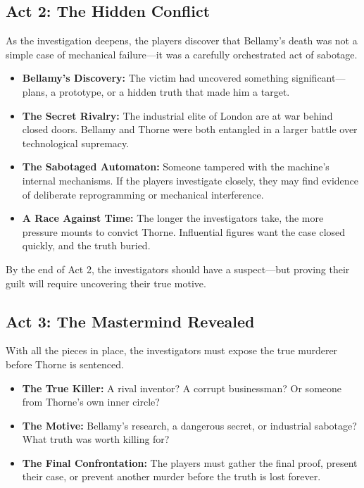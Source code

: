 \subsection{Act 2: The Hidden Conflict}  
As the investigation deepens, the players discover that Bellamy’s death was not a simple case of mechanical failure—it was a carefully orchestrated act of sabotage.

\begin{WyrdExplanation}
    \begin{itemize}
        \item \textbf{Bellamy’s Discovery:} The victim had uncovered something significant—plans, a prototype, or a hidden truth that made him a target.
        \item \textbf{The Secret Rivalry:} The industrial elite of London are at war behind closed doors. Bellamy and Thorne were both entangled in a larger battle over technological supremacy.
        \item \textbf{The Sabotaged Automaton:} Someone tampered with the machine’s internal mechanisms. If the players investigate closely, they may find evidence of deliberate reprogramming or mechanical interference.
        \item \textbf{A Race Against Time:} The longer the investigators take, the more pressure mounts to convict Thorne. Influential figures want the case closed quickly, and the truth buried.
    \end{itemize}
\end{WyrdExplanation}

\noindent
By the end of Act 2, the investigators should have a suspect—but proving their guilt will require uncovering their true motive.

\subsection{Act 3: The Mastermind Revealed}  
With all the pieces in place, the investigators must expose the true murderer before Thorne is sentenced.

\begin{WyrdExplanation}
    \begin{itemize}
        \item \textbf{The True Killer:} A rival inventor? A corrupt businessman? Or someone from Thorne’s own inner circle?
        \item \textbf{The Motive:} Bellamy’s research, a dangerous secret, or industrial sabotage? What truth was worth killing for?
        \item \textbf{The Final Confrontation:} The players must gather the final proof, present their case, or prevent another murder before the truth is lost forever.
    \end{itemize}
\end{WyrdExplanation}

